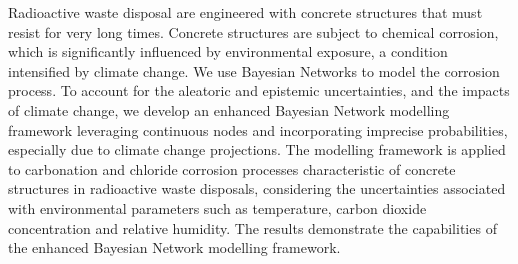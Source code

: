 Radioactive waste disposal are engineered with concrete structures that must resist for very long times. 
Concrete structures are subject to chemical corrosion, which is significantly influenced by environmental exposure, a condition intensified by climate change.
We use Bayesian Networks to model the corrosion process. 
To account for the aleatoric and epistemic uncertainties, and the impacts of climate change, we develop an enhanced Bayesian Network modelling framework leveraging continuous nodes and incorporating imprecise probabilities, especially due to climate change projections. 
The modelling framework is applied to carbonation and chloride corrosion processes characteristic of concrete structures in radioactive waste disposals, considering the uncertainties associated with environmental parameters such as temperature, carbon dioxide concentration and relative humidity.
The results demonstrate the capabilities of the enhanced Bayesian Network modelling framework.